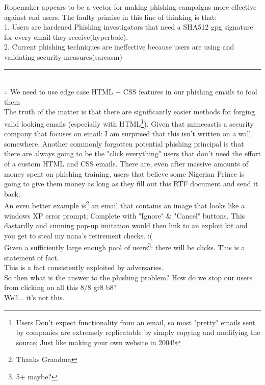 \documentclass[10pt,a4paper]{article}
\begin{document}
		\begin{flushleft}
				{\normalsize Ropemaker appears to be a vector for making phishing campaigns more effective against end users. The faulty primise in this line of thinking is that: }
				\vspace{5 mm}
				\\ 1. Users are hardened Phishing investigators that need  a SHA512 gpg signature for every email they receive(hyperbole).
				\linebreak
				\\ 2. Current phishing techniques are ineffective because users are using and validating security measures(sarcasm)\\
				\vspace{5 mm}
				\rule{\textwidth}{1pt}
				\\\vspace{5 mm}
				$\therefore$ We need to use edge case HTML + CSS features in our phishing emails to fool them
				\vspace{7.5 mm}
				{\normalsize \\The truth of the matter is that there are significantly easier methods for forging valid looking emails (especially with HTML\footnote{Users Don't expect functionality from an email, so most "pretty" emails sent by companies are extremely replicatable by simply copying and modifying the source; Just like making your own website in 2004!}). Given that mimecast\textregistered  is a security company that focuses on email: I am surprised that this isn't written on a wall somewhere.
				Another commonly forgotten potential phishing principal is that there are always going to be the "click everything" users that don't need the effort of a custom HTML and CSS emails. There are, even after massive amounts of money spent on phishing training, users that believe some Nigerian Prince is going to give them money as long as they fill out this RTF document and send it back.\\
				\vspace{2.5 mm}
				An even better example is\footnote{Thanks Grandma} an email that contains an image that looks like a windows XP error prompt; Complete with "Ignore" \& "Cancel" buttons. This dastardly and cunning pop-up imitation would then link to an exploit kit and you get to steal my nana's retirement checks. :(\\
				\vspace{2.5 mm}
				Given a sufficiently large enough pool of users\footnote{5+ maybe?}: there will be clicks. This is a statement of fact. \\This is a fact consistently exploited by adversaries.\\
				\vspace{2.5 mm}
				So then what is the answer to the phishing problem? How do we stop our users from clicking on all this 8/8 gr8 b8?\\ 
				\vspace{2.5 mm}
				Well... it's not this.}
			\pagebreak
			

\end{flushleft}
\end{document}
